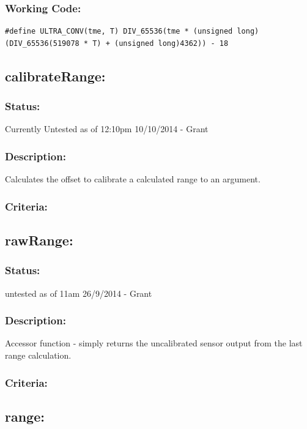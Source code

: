 \documentclass[]{report}
\begin{document}
\subsubsection{Working Code:}
\begin{lstlisting}
#define ULTRA_CONV(tme, T) DIV_65536(tme * (unsigned long)(DIV_65536(519078 * T) + (unsigned long)4362)) - 18
\end{lstlisting}


\subsection{calibrateRange:}
\subsubsection{Status:}
Currently Untested as of 12:10pm 10/10/2014 - Grant

\subsubsection{Description:}
Calculates the offset to calibrate a calculated range to an argument.

\subsubsection{Criteria:}

\subsection{rawRange:}
\subsubsection{Status:}
untested as of 11am 26/9/2014 - Grant

\subsubsection{Description:}
Accessor function - simply returns the uncalibrated sensor output from the last range calculation.

\subsubsection{Criteria:}

\subsection{range:}
\end{document}
